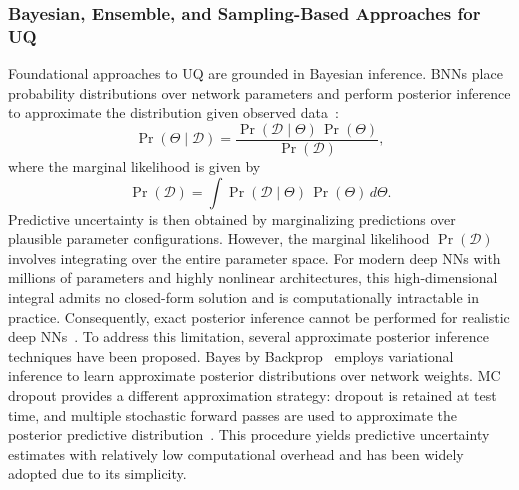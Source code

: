 \subsubsection{Bayesian, Ensemble, and Sampling-Based Approaches for \acs{UQ}}

Foundational approaches to \ac{UQ} are grounded in Bayesian inference. \acp{BNN} place probability distributions over network parameters and perform posterior inference to approximate the distribution given observed data~\cite{neal1996bayesian,blundell2015weightuncertaintyneuralnetworks}:
\[
\Pr(\Theta \mid \mathcal{D}) = \frac{\Pr(\mathcal{D} \mid \Theta)\, \Pr(\Theta)}{\Pr(\mathcal{D})},
\]
where the marginal likelihood is given by
\[
\Pr(\mathcal{D}) = \int \Pr(\mathcal{D} \mid \Theta)\, \Pr(\Theta)\, d\Theta.
\]
Predictive uncertainty is then obtained by marginalizing predictions over plausible parameter configurations. However, the marginal likelihood $\Pr(\mathcal{D})$ involves integrating over the entire parameter space. For modern deep \acp{NN} with millions of parameters and highly nonlinear architectures, this high-dimensional integral admits no closed-form solution and is computationally intractable in practice. Consequently, exact posterior inference cannot be performed for realistic deep 
\acp{NN}~\cite{blundell2015weightuncertaintyneuralnetworks,kingma2022autoencodingvariationalbayes}. To address this limitation, several approximate posterior inference techniques have been proposed. Bayes by Backprop~\cite{blundell2015weightuncertaintyneuralnetworks} employs variational inference to learn approximate posterior distributions over network weights. \ac{MC dropout} provides a different approximation strategy: dropout is retained at test time, and multiple stochastic forward passes are used to approximate the posterior predictive distribution~\cite{gal2016dropoutbayesianapproximationrepresenting}. This procedure yields predictive uncertainty estimates with relatively low computational overhead and has been widely adopted due to its simplicity.


